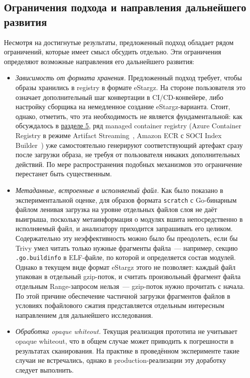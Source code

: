 \subsection{Ограничения подхода и направления дальнейшего развития}

Несмотря на достигнутые результаты, предложенный подход обладает рядом ограничений, которые имеет смысл обсудить отдельно. Эти ограничения определяют возможные направления его дальнейшего развития:

\begin{itemize}
\item \textit{Зависимость от формата хранения.} Предложенный подход требует, чтобы образы хранились в registry в формате eStargz. На стороне пользователя это означает дополнительный шаг конвертации в CI/CD-конвейере, либо настройку сборщика на немедленное создание eStargz-варианта. Стоит, однако, отметить, что эта необходимость не является фундаментальной: как обсуждалось в \hyperref[sec:Chapter4]{разделе 5}, ряд managed container registry (Azure Container Registry в режиме Artifact Streaming~\cite{acr_artifact_streaming}, Amazon ECR с SOCI Index Builder~\cite{ecr_soci_builder}) уже самостоятельно генерируют соответствующий артефакт сразу после загрузки образа, не требуя от пользователя никаких дополнительных действий. По мере распространения подобных механизмов это ограничение перестанет быть существенным.

\item \textit{Метаданные, встроенные в исполняемый файл.} Как было показано в экспериментальной оценке, для образов формата \texttt{scratch} с Go-бинарным файлом ленивая загрузка на уровне отдельных файлов слоя не даёт выигрыша, поскольку метаинформация о модулях вшита непосредственно в исполняемый файл, и анализатору приходится запрашивать его целиком. Содержательно эту неэффективность можно было бы преодолеть, если бы Trivy умел читать только нужные фрагменты файла~--- например, секцию \texttt{.go.buildinfo} в ELF-файле, по которой и определяется состав модулей. Однако в текущем виде формат eStargz этого не позволяет: каждый файл упакован в отдельный gzip-поток, и считать произвольный фрагмент файла отдельным Range-запросом нельзя~--- gzip-поток нужно прочитать с начала. По этой причине обеспечение частичной загрузки фрагментов файлов в условиях пофайлового сжатия представляется отдельным интересным направлением для дальнейшего исследования.

\item \textit{Обработка opaque whiteout.} Текущая реализация прототипа не учитывает opaque whiteout, что в общем случае может приводить к погрешности в результатах сканирования. На практике в проведённом эксперименте такие случаи не встречались, однако в production-реализации эту доработку следует выполнить.


\end{itemize}
